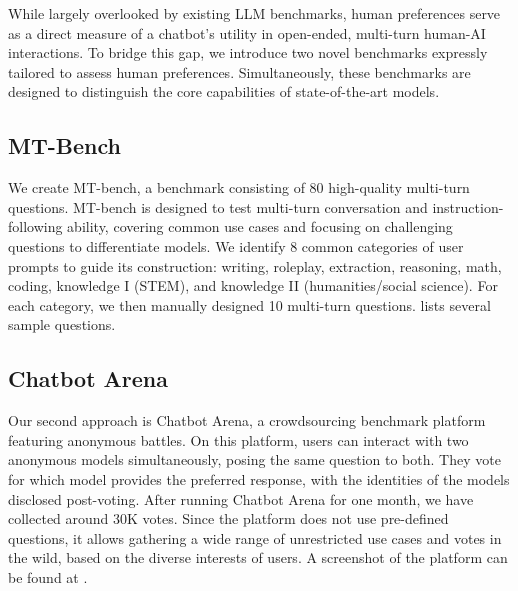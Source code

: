 While largely overlooked by existing LLM benchmarks, human preferences serve as a direct measure of a chatbot's utility in open-ended, multi-turn human-AI interactions. To bridge this gap, we introduce two novel benchmarks expressly tailored to assess human preferences. Simultaneously, these benchmarks are designed to distinguish the core capabilities of state-of-the-art models.


\subsection{MT-Bench}
We create MT-bench, a benchmark consisting of 80 high-quality multi-turn questions.
MT-bench is designed to test multi-turn conversation and instruction-following ability, covering common use cases and focusing on challenging questions to differentiate models.
We identify 8 common categories of user prompts to guide its construction: writing, roleplay, extraction, reasoning, math, coding, knowledge I (STEM), and knowledge II (humanities/social science).
For each category, we then manually designed 10 multi-turn questions.
 lists several sample questions.



\subsection{Chatbot Arena}
Our second approach is Chatbot Arena, a crowdsourcing benchmark platform featuring anonymous battles.
On this platform, users can interact with two anonymous models simultaneously, posing the same question to both. They vote for which model provides the preferred response, with the identities of the models disclosed post-voting. After running Chatbot Arena for one month, we have collected around 30K votes. Since the platform does not use pre-defined questions, it allows gathering a wide range of unrestricted use cases and votes in the wild, based on the diverse interests of users. A screenshot of the platform can be found at .

